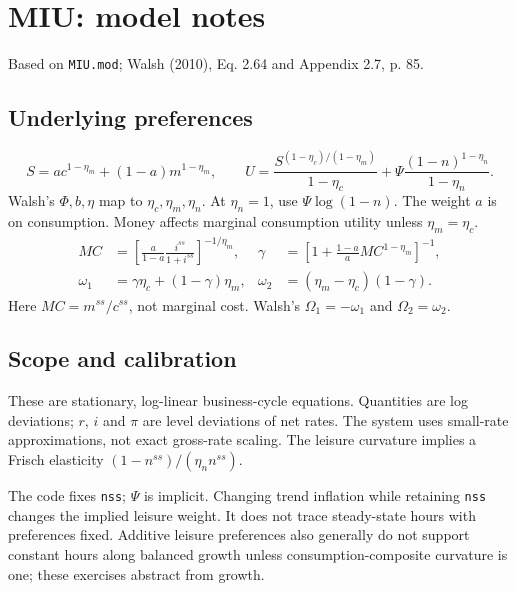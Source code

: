 \documentclass[11pt,a4paper]{article}
\begin{document}
\section*{MIU: model notes}
Based on \texttt{MIU.mod}; Walsh (2010), Eq. 2.64 and Appendix 2.7, p. 85.

\subsection*{Underlying preferences}
\[
S=ac^{1-\eta_m}+(1-a)m^{1-\eta_m},\qquad
U=\frac{S^{(1-\eta_c)/(1-\eta_m)}}{1-\eta_c}
 +\Psi\frac{(1-n)^{1-\eta_n}}{1-\eta_n}.
\]
Walsh's $\Phi,b,\eta$ map to $\eta_c,\eta_m,\eta_n$.
At $\eta_n=1$, use $\Psi\log(1-n)$. The weight $a$ is on consumption.
Money affects marginal consumption utility unless $\eta_m=\eta_c$.
\begin{align*}
MC&=\left[\frac{a}{1-a}\frac{i^{ss}}{1+i^{ss}}\right]^{-1/\eta_m},&
\gamma&=\left[1+\frac{1-a}{a}MC^{1-\eta_m}\right]^{-1},\\
\omega_1&=\gamma\eta_c+(1-\gamma)\eta_m,&
\omega_2&=(\eta_m-\eta_c)(1-\gamma).
\end{align*}
Here $MC=m^{ss}/c^{ss}$, not marginal cost. Walsh's $\Omega_1=-\omega_1$
and $\Omega_2=\omega_2$.

\subsection*{Scope and calibration}
These are stationary, log-linear business-cycle equations. Quantities are
log deviations; $r$, $i$ and $\pi$ are level deviations of net rates.
The system uses small-rate approximations, not exact gross-rate scaling.
The leisure curvature implies a Frisch elasticity
$(1-n^{ss})/(\eta_n n^{ss})$.

The code fixes \texttt{nss}; $\Psi$ is implicit. Changing trend inflation
while retaining \texttt{nss} changes the implied leisure weight. It does not
trace steady-state hours with preferences fixed. Additive leisure preferences
also generally do not support constant hours along balanced growth unless
consumption-composite curvature is one; these exercises abstract from growth.
\newpage
\end{document}
